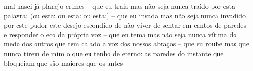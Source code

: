 \begin{poem}
\begin{stanza}
\qquad mal nasci\verseline
\qquad já planejo crimes\verseline
 – que eu traia\verseline
mas não seja nunca traído\verseline
por esta palavra:\verseline
\qquad (ou esta:\verseline
\qquad \qquad ou esta:\verseline
\qquad \qquad \qquad ou esta:)\verseline
 – que eu invada\verseline
mas não seja nunca\verseline
invadido por este pudor\verseline
\qquad \qquad este desejo escondido\verseline
\qquad \qquad de não viver\verseline
\qquad \qquad de sentar em cantos\verseline
\qquad \qquad \qquad de paredes\verseline
\qquad \qquad e responder o eco\verseline
\qquad \qquad \qquad da própria voz\verseline
\qquad – que eu tema\verseline
\qquad mas não seja nunca vítima\verseline
\qquad do medo dos outros\verseline
\qquad que tem calado a voz\verseline
\qquad dos nossos abraços\verseline
 – que eu roube\verseline
mas que nunca tirem de mim\verseline
o que eu tenho de eterno:\verseline
\quad as paredes do instante\verseline
\quad que bloqueiam\verseline
\quad que são maiores que os antes
\end{stanza}
\end{poem}